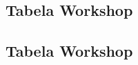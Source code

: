 \documentclass[
    12pt,                %
    oneside,            %
    a4paper,            %
    english,            %
    brazil                %
    ]{abntex2ppgsi}
\begin{document}

\begin{apendicesenv}


%
%
%
\chapter{Tabela Workshop}

\section*{Tabela Workshop}


\end{apendicesenv}
\end{document}
